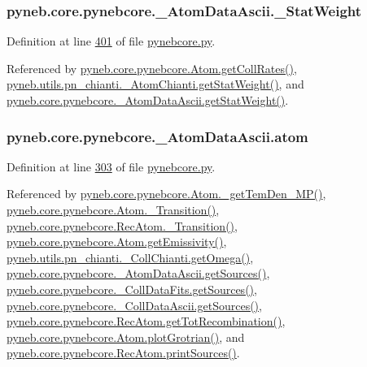 \subsubsection[{\+\_\+\+Stat\+Weight}]{\setlength{\rightskip}{0pt plus 5cm}pyneb.\+core.\+pynebcore.\+\_\+\+Atom\+Data\+Ascii.\+\_\+\+Stat\+Weight\hspace{0.3cm}{\ttfamily [private]}}\label{classpyneb_1_1core_1_1pynebcore_1_1___atom_data_ascii_ac3e956654089ac966a877dbaa003e3ea}


Definition at line \hyperlink{pynebcore_8py_source_l00401}{401} of file \hyperlink{pynebcore_8py_source}{pynebcore.\+py}.



Referenced by \hyperlink{pynebcore_8py_source_l01329}{pyneb.\+core.\+pynebcore.\+Atom.\+get\+Coll\+Rates()}, \hyperlink{pn__chianti_8py_source_l00323}{pyneb.\+utils.\+pn\+\_\+chianti.\+\_\+\+Atom\+Chianti.\+get\+Stat\+Weight()}, and \hyperlink{pynebcore_8py_source_l00502}{pyneb.\+core.\+pynebcore.\+\_\+\+Atom\+Data\+Ascii.\+get\+Stat\+Weight()}.

\hypertarget{classpyneb_1_1core_1_1pynebcore_1_1___atom_data_ascii_a5c98b93fd3ae381abca175c8baee6c0e}{}
\subsubsection[{atom}]{\setlength{\rightskip}{0pt plus 5cm}pyneb.\+core.\+pynebcore.\+\_\+\+Atom\+Data\+Ascii.\+atom}\label{classpyneb_1_1core_1_1pynebcore_1_1___atom_data_ascii_a5c98b93fd3ae381abca175c8baee6c0e}


Definition at line \hyperlink{pynebcore_8py_source_l00303}{303} of file \hyperlink{pynebcore_8py_source}{pynebcore.\+py}.



Referenced by \hyperlink{pynebcore_8py_source_l01980}{pyneb.\+core.\+pynebcore.\+Atom.\+\_\+get\+Tem\+Den\+\_\+\+M\+P()}, \hyperlink{pynebcore_8py_source_l01367}{pyneb.\+core.\+pynebcore.\+Atom.\+\_\+\+Transition()}, \hyperlink{pynebcore_8py_source_l02696}{pyneb.\+core.\+pynebcore.\+Rec\+Atom.\+\_\+\+Transition()}, \hyperlink{pynebcore_8py_source_l01716}{pyneb.\+core.\+pynebcore.\+Atom.\+get\+Emissivity()}, \hyperlink{pn__chianti_8py_source_l00484}{pyneb.\+utils.\+pn\+\_\+chianti.\+\_\+\+Coll\+Chianti.\+get\+Omega()}, \hyperlink{pynebcore_8py_source_l00448}{pyneb.\+core.\+pynebcore.\+\_\+\+Atom\+Data\+Ascii.\+get\+Sources()}, \hyperlink{pynebcore_8py_source_l00673}{pyneb.\+core.\+pynebcore.\+\_\+\+Coll\+Data\+Fits.\+get\+Sources()}, \hyperlink{pynebcore_8py_source_l01003}{pyneb.\+core.\+pynebcore.\+\_\+\+Coll\+Data\+Ascii.\+get\+Sources()}, \hyperlink{pynebcore_8py_source_l02735}{pyneb.\+core.\+pynebcore.\+Rec\+Atom.\+get\+Tot\+Recombination()}, \hyperlink{pynebcore_8py_source_l02372}{pyneb.\+core.\+pynebcore.\+Atom.\+plot\+Grotrian()}, and \hyperlink{pynebcore_8py_source_l02796}{pyneb.\+core.\+pynebcore.\+Rec\+Atom.\+print\+Sources()}.


